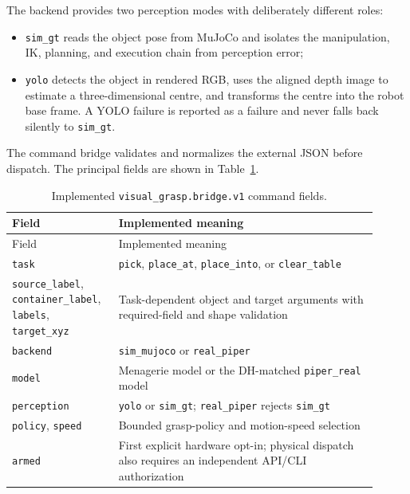 The backend provides two perception modes with deliberately different roles:

\begin{itemize}
\item \texttt{sim\_gt} reads the object pose from MuJoCo and isolates the
      manipulation, IK, planning, and execution chain from perception error;
\item \texttt{yolo} detects the object in rendered RGB, uses the aligned depth
      image to estimate a three-dimensional centre, and transforms the centre
      into the robot base frame. A YOLO failure is reported as a failure and
      never falls back silently to \texttt{sim\_gt}.
\end{itemize}

The command bridge validates and normalizes the external JSON before
dispatch. The principal fields are shown in Table~\ref{tab:backend-command}.

\begin{longtable}{@{}
>{\raggedright\arraybackslash}p{0.25\linewidth}
>{\raggedright\arraybackslash}p{0.66\linewidth}@{}}
\caption{Implemented \texttt{visual\_grasp.bridge.v1} command fields.}
\label{tab:backend-command}\\
\toprule
Field & Implemented meaning \\
\midrule
\endfirsthead
\toprule
Field & Implemented meaning \\
\midrule
\endhead
\bottomrule
\endfoot
\texttt{task} & \texttt{pick}, \texttt{place\_at},
\texttt{place\_into}, or \texttt{clear\_table} \\
\texttt{source\_label}, \texttt{container\_label},
\texttt{labels}, \texttt{target\_xyz} & Task-dependent object and target
arguments with required-field and shape validation \\
\texttt{backend} & \texttt{sim\_mujoco} or \texttt{real\_piper} \\
\texttt{model} & Menagerie model or the DH-matched
\texttt{piper\_real} model \\
\texttt{perception} & \texttt{yolo} or \texttt{sim\_gt};
\texttt{real\_piper} rejects \texttt{sim\_gt} \\
\texttt{policy}, \texttt{speed} & Bounded grasp-policy and motion-speed
selection \\
\texttt{armed} & First explicit hardware opt-in; physical dispatch also
requires an independent API/CLI authorization \\
\end{longtable}

